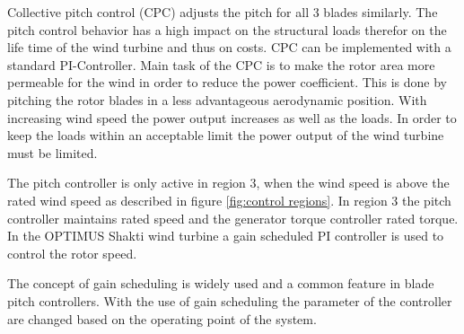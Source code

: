 Collective pitch control (CPC) adjusts the pitch for all 3 blades similarly.
The pitch control behavior has a high impact on the structural loads therefor on the life time of the wind turbine and thus on costs.
CPC can be implemented with a standard PI-Controller.
Main task of the CPC is to make the rotor area more permeable for the wind in order to reduce the power coefficient.
This is done by pitching the rotor blades in a less advantageous aerodynamic position.
With increasing wind speed the power output increases as well as the loads.
In order to keep the loads within an acceptable limit the power output of the wind turbine must be limited.

The pitch controller is only active in region 3, when the wind speed is above the rated wind speed as described in figure \ref{fig:control regions}.
In region 3 the pitch controller maintains rated speed and the generator torque controller rated torque. In the OPTIMUS Shakti wind turbine a gain scheduled PI controller is used to control the rotor speed.

The concept of gain scheduling is widely used and a common feature in blade pitch controllers.
With the use of gain scheduling the parameter of the controller are changed based on the operating point of the system. 



